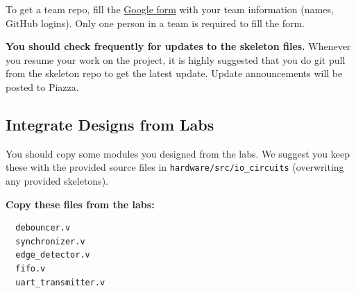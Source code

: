 \documentclass[11pt]{article}
\begin{document}
To get a team repo, fill the \href{https://docs.google.com/spreadsheets/d/1me8UbxdPkuWcUw25fGh9d9KCvhcWxplXCiFuPWfstoY/edit#gid=0}{Google form} with your team information (names, GitHub logins). Only one person in a team is required to fill the form.

\textbf{You should check frequently for updates to the skeleton files.} Whenever you resume your work on the project,
it is highly suggested that you do git pull from the skeleton repo to get the latest update.
Update announcements will be posted to Piazza.

\subsection{Integrate Designs from Labs} \label{sec:past_designs}
You should copy some modules you designed from the labs.
We suggest you keep these with the provided source files in \verb|hardware/src/io_circuits| (overwriting any provided skeletons).

\textbf{Copy these files from the labs:}
\begin{verbatim}
  debouncer.v
  synchronizer.v
  edge_detector.v
  fifo.v
  uart_transmitter.v
\end{verbatim}
\end{document}
